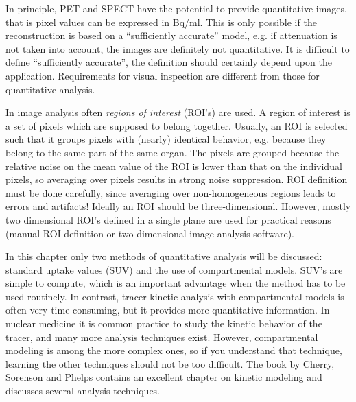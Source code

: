\documentclass[11pt,oneside]{article}
\begin{document}
In principle, PET and SPECT have the potential to provide quantitative images,
that is pixel values can be expressed in Bq/ml. This is only possible if the
reconstruction is based on a ``sufficiently accurate'' model, e.g. if
attenuation is not taken into account, the images are definitely not
quantitative. It is difficult to define ``sufficiently accurate'', the
definition should certainly depend upon the application. Requirements for
visual inspection are different from those for quantitative analysis.

In image analysis often {\em regions of interest} (ROI's) are used. A region
of interest is a set of pixels which are supposed to belong together. Usually,
an ROI is selected such that it groups pixels with (nearly) identical
behavior, e.g. because they belong to the same part of the same organ. The
pixels are grouped because the relative noise on the mean value of the ROI is
lower than that on the individual pixels, so averaging over pixels results in
strong noise suppression. ROI definition must be done carefully, since
averaging over non-homogeneous regions leads to errors and artifacts! Ideally
an ROI should be three-dimensional. However, mostly two dimensional ROI's
defined in a single plane are used for practical reasons (manual ROI
definition or two-dimensional image analysis software).

In this chapter only two methods of quantitative analysis will be
discussed: standard uptake values (SUV) and the use of compartmental
models. SUV's are simple to compute, which is an important advantage
when the method has to be used routinely. In contrast, tracer kinetic
analysis with compartmental models is often very time consuming, but
it provides more quantitative information.  In nuclear medicine it is
common practice to study the kinetic behavior of the tracer, and many
more analysis techniques exist. However, compartmental modeling is
among the more complex ones, so if you understand that technique,
learning the other techniques should not be too difficult.  The book
by Cherry, Sorenson and Phelps \cite{Cherry} contains an excellent
chapter on kinetic modeling and discusses several analysis techniques.
\end{document}
